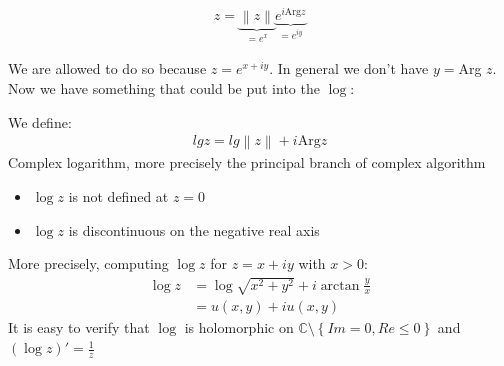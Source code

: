 \begin{align*} 
	z = \underbrace{\left\|z\right\|}_{= e^{x}}\underbrace{e^{i\text{Arg}z}}_{= e^{iy} }
	\end{align*}
	\begin{framedremark}
	We are allowed to do so because $z = e^{x + iy}$. In general we don't have $y =  $Arg $z$. Now we have something that could be put into the $\log$:
	\end{framedremark}
\begin{definition}
	We define:
	\begin{align*} 
		lg z =  lg \left\|z\right\| + i \text{Arg} z
	\end{align*}
	Complex logarithm, more precisely the principal branch of complex algorithm
\end{definition}
\begin{framedremark}
\begin{itemize}
    \item $\log z$ is not defined at $z= 0$
    \item $\log z$ is discontinuous on the negative real axis
\end{itemize}
More precisely, computing $\log z$ for $z =  x + iy$ with $x > 0$:
\begin{align*} 
	\log z &=  \log \sqrt{x^2 + y^2} + i \arctan \frac{y}{x}\\
		   &= u\left(x, y\right) + iu\left(x, y\right)
\end{align*}
It is easy to verify that $\log$ is holomorphic on $\mathbb{C} \setminus \left\{Im = 0, Re \leq 0\right\}$ and $\left(\log z\right)' = \frac{1}{z}$
\end{framedremark}
